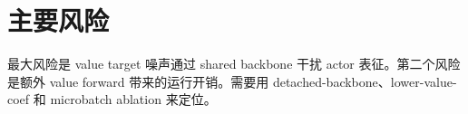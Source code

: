 \documentclass[10pt]{ctexart}
\begin{document}
\section*{主要风险}
最大风险是 value target 噪声通过 shared backbone 干扰 actor 表征。第二个风险是额外 value forward 带来的运行开销。需要用 detached-backbone、lower-value-coef 和 microbatch ablation 来定位。
\end{document}

